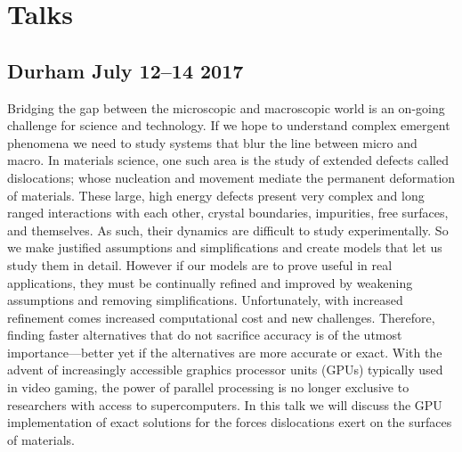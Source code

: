 \chapter{Talks}
	\section{Durham July 12--14 2017}
		Bridging the gap between the microscopic and macroscopic world is an on-going challenge for science and technology. If we hope to understand complex emergent phenomena we need to study systems that blur the line between micro and macro. In materials science, one such area is the study of extended defects called dislocations; whose nucleation and movement mediate the permanent deformation of materials. These large, high energy defects present very complex and long ranged interactions with each other, crystal boundaries, impurities, free surfaces, and themselves. As such, their dynamics are difficult to study experimentally. So we make justified assumptions and simplifications and create models that let us study them in detail. However if our models are to prove useful in real applications, they must be continually refined and improved by weakening assumptions and removing simplifications. Unfortunately, with increased refinement comes increased computational cost and new challenges. Therefore, finding faster alternatives that do not sacrifice accuracy is of the utmost importance---better yet if the alternatives are more accurate or exact. With the advent of increasingly accessible graphics processor units (GPUs) typically used in video gaming, the power of parallel processing is no longer exclusive to researchers with access to supercomputers. In this talk we will discuss the GPU implementation of exact solutions for the forces dislocations exert on the surfaces of materials.